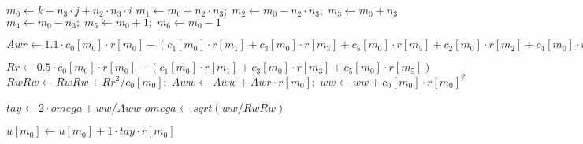 \documentclass{article}
\begin{document}
\begin{algorithm}
\begin{algorithmic}[1]
\State $m_0 \gets k + n_3 \cdot j + n_2 \cdot n_3 \cdot i$
\State $m_1 \gets m_0 + n_2 \cdot n_3;\; m_2 \gets m_0 - n_2 \cdot n_3;\; m_3 \gets m_0 + n_3$
\State $m_4 \gets m_0 - n_3;\; m_5 \gets m_0 + 1;\; m_6 \gets m_0 - 1$
\State \parbox[t]{\dimexpr\linewidth-\algorithmicindent-\algorithmicindent-\algorithmicindent-\algorithmicindent-\algorithmicindent}{$Awr \gets 1.1 \cdot c_0[m_0] \cdot r[m_0] - (c_1[m_0] \cdot r[m_1] + c_3[m_0] \cdot r[m_3] + c_5[m_0] \cdot r[m_5] + c_2[m_0] \cdot r[m_2] + c_4[m_0] \cdot r[m_4] + c_6[m_0] \cdot r[m_6])$}
\State $Rr \gets 0.5 \cdot c_0[m_0] \cdot r[m_0] - (c_1[m_0] \cdot r[m_1] + c_3[m_0] \cdot r[m_3] + c_5[m_0] \cdot r[m_5])$
\State $RwRw \gets RwRw + Rr^2 / c_0[m_0];\; Aww \gets Aww + Awr \cdot r[m_0];\; ww \gets ww + c_0[m_0] \cdot r[m_0]^2$
\EndIf
\EndFor
\EndFor
\EndFor

\State $tay \gets 2 \cdot omega + ww / Aww$
\State $omega \gets sqrt(ww / RwRw)$
\EndIf

\State $u[m_0] \gets u[m_0] + 1 \cdot tay \cdot r[m_0]$
\EndFor



 

\end{algorithmic}
\end{algorithm}
 
 
\end{document}
